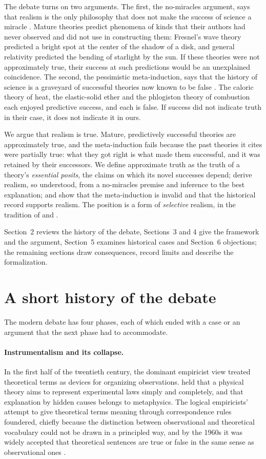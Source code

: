 \documentclass{situationist-preprint}
\begin{document}
The debate turns on two arguments. The first, the no-miracles argument, says that realism is the only philosophy that does not make the success of science a miracle \citep[73]{Putnam1975}. Mature theories predict phenomena of kinds that their authors had never observed and did not use in constructing them: Fresnel's wave theory predicted a bright spot at the center of the shadow of a disk, and general relativity predicted the bending of starlight by the sun. If these theories were not approximately true, their success at such predictions would be an unexplained coincidence. The second, the pessimistic meta-induction, says that the history of science is a graveyard of successful theories now known to be false \citep{Laudan1981}. The caloric theory of heat, the elastic-solid ether and the phlogiston theory of combustion each enjoyed predictive success, and each is false. If success did not indicate truth in their case, it does not indicate it in ours.

We argue that realism is true. Mature, predictively successful theories are approximately true, and the meta-induction fails because the past theories it cites were partially true: what they got right is what made them successful, and it was retained by their successors. We define approximate truth as the truth of a theory's \emph{essential posits}, the claims on which its novel successes depend; derive realism, so understood, from a no-miracles premise and inference to the best explanation; and show that the meta-induction is invalid and that the historical record supports realism. The position is a form of \emph{selective} realism, in the tradition of \citet{Kitcher1993} and \citet{Psillos1999}.

Section~2 reviews the history of the debate, Sections~3 and 4 give the framework and the argument, Section~5 examines historical cases and Section~6 objections; the remaining sections draw consequences, record limits and describe the formalization.

\section{A short history of the debate}

The modern debate has four phases, each of which ended with a case or an argument that the next phase had to accommodate.

\paragraph{Instrumentalism and its collapse.} In the first half of the twentieth century, the dominant empiricist view treated theoretical terms as devices for organizing observations. \citet{Duhem1954} held that a physical theory aims to represent experimental laws simply and completely, and that explanation by hidden causes belongs to metaphysics. The logical empiricists' attempt to give theoretical terms meaning through correspondence rules foundered, chiefly because the distinction between observational and theoretical vocabulary could not be drawn in a principled way, and by the 1960s it was widely accepted that theoretical sentences are true or false in the same sense as observational ones \citep{Smart1963}.
\end{document}
